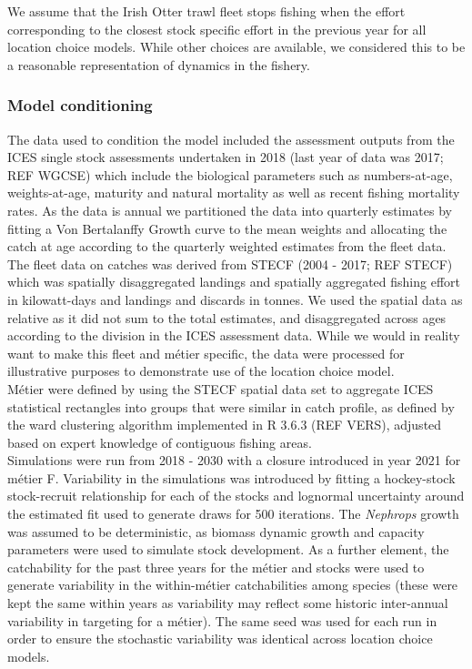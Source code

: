 \documentclass[12pt, halfline, a4paper]{ouparticle}
\begin{document}
We assume that the Irish Otter trawl fleet stops fishing when the effort
corresponding to the closest stock specific effort in the previous year for all
location choice models. While other choices are available, we considered this
to be a reasonable representation of dynamics in the fishery. 

\subsubsection{Model conditioning}

The data used to condition the model included the assessment outputs from the
ICES single stock assessments undertaken in 2018 (last year of data was
2017; REF WGCSE) which include the biological parameters such as
numbers-at-age, weights-at-age, maturity and natural mortality as well as
recent fishing mortality rates. As the data is annual we partitioned the data
into quarterly estimates by fitting a Von Bertalanffy Growth curve to the mean
weights and allocating the catch at age according to the quarterly weighted
estimates from the fleet data. \\

The fleet data on catches was derived from STECF (2004 - 2017; REF STECF) which
was spatially disaggregated landings and spatially aggregated fishing effort in
kilowatt-days and landings and discards in tonnes. We used the spatial data as
relative as it did not sum to the total estimates, and disaggregated across
ages according to the division in the ICES assessment data. While we would in
reality want to make this fleet and métier specific, the data were processed
for illustrative purposes to demonstrate use of the location choice model. \\

Métier were defined by using the STECF spatial data set to aggregate ICES
statistical rectangles into groups that were similar in catch profile, as
defined by the ward clustering algorithm implemented in R 3.6.3 (REF VERS),
adjusted based on expert knowledge of contiguous fishing areas. \\ 

Simulations were run from 2018 - 2030 with a closure introduced in year 2021
for métier F.  Variability in the simulations was introduced by fitting a
hockey-stock stock-recruit relationship for each of the stocks and lognormal
uncertainty around the estimated fit used to generate draws for 500 iterations.
The \textit{Nephrops} growth was assumed to be deterministic, as biomass
dynamic growth and capacity parameters were used to simulate stock development.
As a further element, the catchability for the past three years for the métier
and stocks were used to generate variability in the within-métier
catchabilities among species (these were kept the same within years as
variability may reflect some historic inter-annual variability in targeting for
a métier). The same seed was used for each run in order to ensure the
stochastic variability was identical across location choice models.
\end{document}
